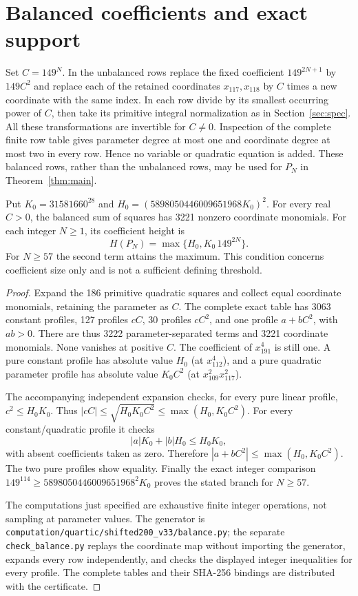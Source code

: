 \documentclass[11pt,a4paper]{article}
\begin{document}
\section{Balanced coefficients and exact support}\label{sec:balance}
Set $C=149^N$. In the unbalanced rows replace the fixed coefficient
$149^{2N+1}$ by $149C^2$ and replace each of the retained coordinates
$x_{117},x_{118}$ by $C$ times a new coordinate with the same index.
In each row divide by its smallest occurring power of $C$, then take
its primitive integral normalization as in Section~\ref{sec:spec}.
All these transformations are invertible for $C\ne0$. Inspection of the
complete finite row table gives parameter degree at most one and coordinate
degree at most two in every row. Hence no variable or quadratic equation
is added. These balanced rows, rather than the unbalanced rows, may be used
for $P_N$ in Theorem~\ref{thm:main}.

\begin{proposition}
Put $K_0=31581660^{28}$ and $H_0=(5898050446009651968K_0)^2$.
For every real $C>0$, the balanced sum of squares has 3221 nonzero
coordinate monomials. For each integer $N\ge1$, its coefficient height is
\[
 H(P_N)=\max\{H_0,K_0\,149^{2N}\}.
\]
For $N\ge57$ the second term attains the maximum. This condition concerns
coefficient size only and is not a sufficient defining threshold.
\end{proposition}
\begin{proof}
Expand the 186 primitive quadratic squares and collect equal coordinate
monomials, retaining the parameter as $C$. The complete exact table has
3063 constant profiles, 127 profiles $cC$, 30 profiles $cC^2$, and one
profile $a+bC^2$, with $ab>0$. There are thus 3222 parameter-separated
terms and 3221 coordinate monomials. None vanishes at positive $C$.
The coefficient of $x_{191}^4$ is still one. A pure constant profile has
absolute value $H_0$ (at $x_{112}^4$), and a pure quadratic parameter
profile has absolute value $K_0C^2$ (at $x_{109}^2x_{117}^2$).

The accompanying independent expansion checks, for every pure linear
profile, $c^2\le H_0K_0$. Thus
$|cC|\le\sqrt{H_0K_0C^2}\le\max(H_0,K_0C^2)$.
For every constant/quadratic profile it checks
\[
 |a|K_0+|b|H_0\le H_0K_0,
\]
with absent coefficients taken as zero. Therefore
$|a+bC^2|\le\max(H_0,K_0C^2)$. The two pure profiles show equality.
Finally the exact integer comparison
$149^{114}\ge5898050446009651968^2K_0$ proves the stated branch for
$N\ge57$.

The computations just specified are exhaustive finite integer operations,
not sampling at parameter values. The generator is
\nolinkurl{computation/quartic/shifted200_v33/balance.py}; the separate
\nolinkurl{check_balance.py} replays the coordinate map without importing
the generator, expands every row independently, and checks the displayed
integer inequalities for every profile. The complete tables and their
SHA-256 bindings are distributed with the certificate.
\end{proof}
\end{document}

